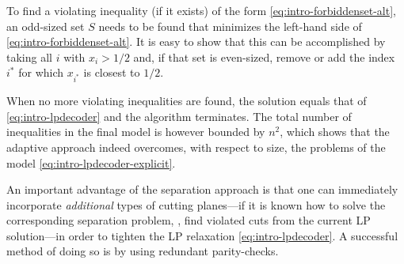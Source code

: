 To find a violating inequality (if it exists) of the form \cref{eq:intro-forbiddenset-alt}, an odd-sized set $S$ needs to be found that minimizes the left-hand side of \cref{eq:intro-forbiddenset-alt}. It is easy to show \cite{Taghavi+11EfficientLPD} that this can be accomplished by taking all $i$ with $x_i > 1/2$ and, if that set is even-sized, remove or add the index $i^*$ for which $x_{i^*}$ is closest to $1/2$.

When no more violating inequalities are found, the solution equals that of \cref{eq:intro-lpdecoder} and the algorithm terminates. The total number of inequalities in the final model is however bounded by $n^2$, which shows that the adaptive approach indeed overcomes, with respect to size, the problems of the model \cref{eq:intro-lpdecoder-explicit}.

An important advantage of the separation approach is that one can immediately incorporate \emph{additional} types of cutting planes—if it is known how to solve the corresponding separation problem, \ie, find violated cuts from the current LP solution—in order to tighten the LP relaxation \cref{eq:intro-lpdecoder}. A successful method of doing so is by using redundant parity-checks.
